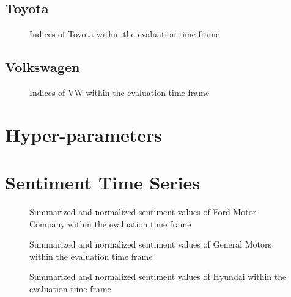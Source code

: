 \subsection{Toyota}
\label{ss:analysis-datasets-toyota}

\begin{figure}[hbt]
    \centering
        
    \caption{Indices of Toyota within the evaluation time frame}
    \label{fig:analysis-indices-toyota}
\end{figure}   

\subsection{Volkswagen}
\label{ss:analysis-datasets-vw}

\begin{figure}[hbt]
    \centering
        
    \caption{Indices of VW within the evaluation time frame}
    \label{fig:analysis-indices-vw}
\end{figure}   

\section{Hyper-parameters}
\label{s:analysis-pipelines}

\section{Sentiment Time Series}
\label{s:analysis-sentiments}

\begin{figure}[hbt]
    \centering
        
    \caption{Summarized and normalized sentiment values of Ford Motor Company within the evaluation time frame}
    \label{fig:analysis-results-ford}
\end{figure} 

\begin{figure}[hbt]
    \centering
        
    \caption{Summarized and normalized sentiment values of General Motors within the evaluation time frame}
    \label{fig:analysis-results-gm}
\end{figure} 

\begin{figure}[hbt]
    \centering
        
    \caption{Summarized and normalized sentiment values of Hyundai within the evaluation time frame}
    \label{fig:analysis-results-hyundai}
\end{figure} 

